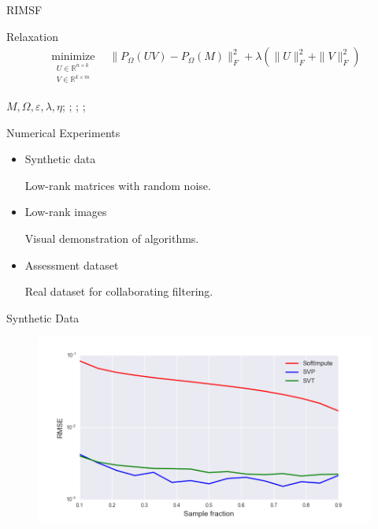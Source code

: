 \documentclass{beamer}
\begin{document}
\begin{frame}{RIMSF}

\begin{block}{Relaxation}
	\vspace{-0.3cm}
	\begin{align*}
	\mathop{\text{minimize}}\limits_{\substack{	U \in \mathbb{R}^{n \times k} \\ V \in \mathbb{R}^{k \times m}}} \quad \|P_{\Omega} (UV) - P_{\Omega} (M)\|_F^2 + \lambda \left(\| U \|^2_F + \| V \|^2_F\right)
	\end{align*}
\end{block}
	
\begin{algorithmic}[1]
	\REQUIRE $M, \Omega, \varepsilon, \lambda, \eta$;
	;
	;
	\REPEAT
	;
	\ENDFOR
\end{algorithmic}
\end{frame}
\begin{frame}{Numerical Experiments}
\begin{itemize}
	\item Synthetic data
	
	Low-rank matrices with random noise.
	\item Low-rank images
	
	Visual demonstration of algorithms.
	\item Assessment dataset
	
	Real dataset for collaborating filtering.
\end{itemize}

\end{frame}
\begin{frame}{Synthetic Data}
\begin{figure}[h]
	\centering
	\includegraphics[width=1\linewidth]{./../results/synthetic/exper_1/synthetic_nsamp_rmse.png}
	\label{heat_map}
\end{figure}
\end{frame}
\end{document}
